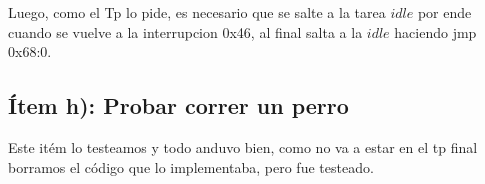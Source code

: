 Luego, como el Tp lo pide, es necesario que se salte a la tarea $idle$ por ende cuando se vuelve a la interrupcion 0x46, al final salta a la $idle$ haciendo jmp 0x68:0.

\subsection{Ítem h): Probar correr un perro}

Este itém lo testeamos y todo anduvo bien, como no va a estar en el tp final borramos el código que lo implementaba, pero fue testeado.

